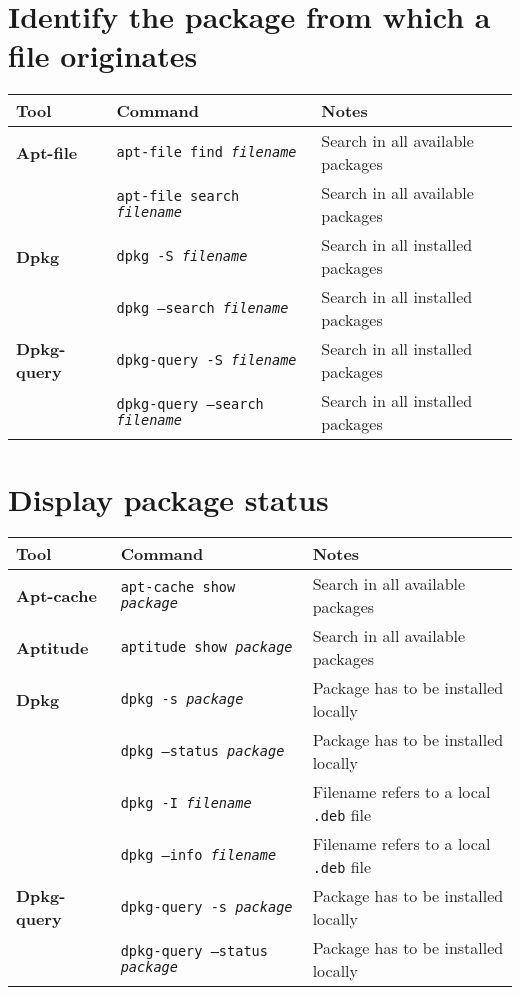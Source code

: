 \documentclass[10pt]{article}
\begin{document}
\section{Identify the package from which a file originates}
\begin{tabular}{ p{3.5cm} p{9cm} p{11cm}}
  \hline
  \rowcolor{Gray}
  \textbf{Tool} & \textbf{Command} & \textbf{Notes} \\
  \hline 
  \textbf{Apt-file} & \texttt{apt-file find \textit{filename}} & Search in all available packages\\
  \rowcolor{Gray}
  & \texttt{apt-file search \textit{filename}} & Search in all available packages\\
  \textbf{Dpkg} & \texttt{dpkg -S \textit{filename}} & Search in all installed packages\\
  \rowcolor{Gray}
  & \texttt{dpkg --search \textit{filename}} & Search in all installed packages \\
  \textbf{Dpkg-query} & \texttt{dpkg-query -S \textit{filename}} & Search in all installed packages\\
  \rowcolor{Gray}
  & \texttt{dpkg-query --search \textit{filename}} & Search in all installed packages \\
  \hline
\end{tabular}

\section{Display package status}
\begin{tabular}{ p{3.5cm} p{9cm} p{11cm}}
  \hline
  \rowcolor{Gray}
  \textbf{Tool} & \textbf{Command} & \textbf{Notes} \\
  \hline 
  \textbf{Apt-cache} & \texttt{apt-cache show \textit{package}} & Search in all available packages\\
  \rowcolor{Gray}
  \textbf{Aptitude} & \texttt{aptitude show \textit{package}} & Search in all available packages\\
  \textbf{Dpkg} & \texttt{dpkg -s \textit{package}} & Package has to be installed locally\\
  \rowcolor{Gray}
  & \texttt{dpkg --status \textit{package}} & Package has to be installed locally\\
  & \texttt{dpkg -I \textit{filename}} & Filename refers to a local \texttt{.deb} file \\
  \rowcolor{Gray}
  & \texttt{dpkg --info \textit{filename}} & Filename refers to a local \texttt{.deb} file \\
  \textbf{Dpkg-query} & \texttt{dpkg-query -s \textit{package}} & Package has to be installed locally\\
  \rowcolor{Gray}
  & \texttt{dpkg-query --status \textit{package}} & Package has to be installed locally \\
  \hline
\end{tabular}
\end{document}
